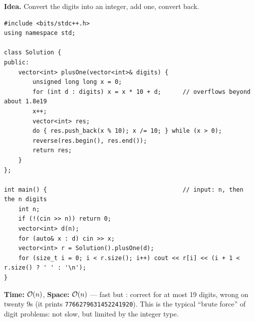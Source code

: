 \begin{bruteforcebox}
\textbf{Idea.} Convert the digits into an integer, add one, convert back.
\begin{lstlisting}[style=cpp]
#include <bits/stdc++.h>
using namespace std;

class Solution {
public:
    vector<int> plusOne(vector<int>& digits) {
        unsigned long long x = 0;
        for (int d : digits) x = x * 10 + d;      // overflows beyond about 1.8e19
        x++;
        vector<int> res;
        do { res.push_back(x % 10); x /= 10; } while (x > 0);
        reverse(res.begin(), res.end());
        return res;
    }
};

int main() {                                      // input: n, then the n digits
    int n;
    if (!(cin >> n)) return 0;
    vector<int> d(n);
    for (auto& x : d) cin >> x;
    vector<int> r = Solution().plusOne(d);
    for (size_t i = 0; i < r.size(); i++) cout << r[i] << (i + 1 < r.size() ? ' ' : '\n');
}
\end{lstlisting}
\begin{complexitybox}
\textbf{Time:} $\mathcal{O}(n)$, \textbf{Space:} $\mathcal{O}(n)$ --- fast but \wa{}: correct for at most 19 digits, wrong on twenty 9s (it prints \texttt{7766279631452241920}). This is the typical ``brute force'' of digit problems: not slow, but limited by the integer type.
\end{complexitybox}
\end{bruteforcebox}

